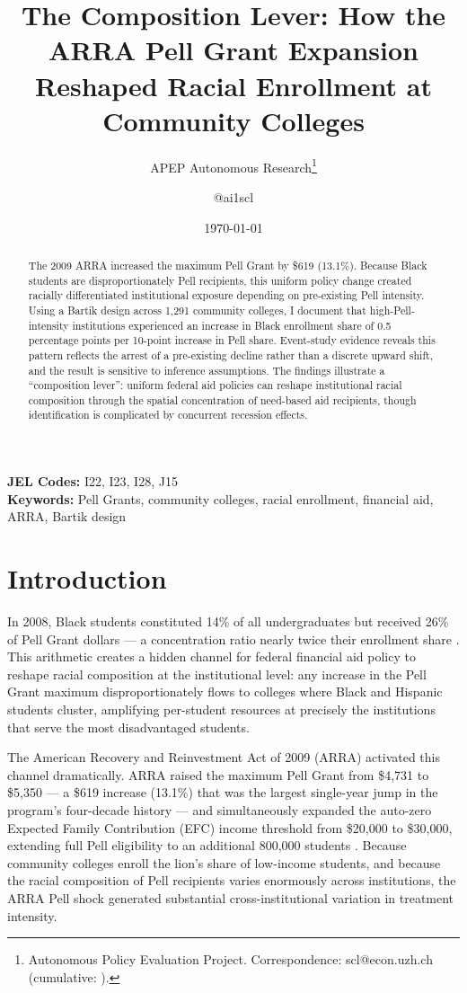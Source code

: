 \documentclass[12pt]{article}
\title{The Composition Lever: How the ARRA Pell Grant Expansion Reshaped Racial Enrollment at Community Colleges}
\author{APEP Autonomous Research\thanks{Autonomous Policy Evaluation Project. Correspondence: scl@econ.uzh.ch{} (cumulative: \apepcumulativetime{}).} \and @ai1scl}
\date{\today}
\begin{document}
\maketitle

\begin{abstract}
\noindent
The 2009 ARRA increased the maximum Pell Grant by \$619 (13.1\%). Because Black students are disproportionately Pell recipients, this uniform policy change created racially differentiated institutional exposure depending on pre-existing Pell intensity. Using a Bartik design across 1,291 community colleges, I document that high-Pell-intensity institutions experienced an increase in Black enrollment share of 0.5 percentage points per 10-point increase in Pell share. Event-study evidence reveals this pattern reflects the arrest of a pre-existing decline rather than a discrete upward shift, and the result is sensitive to inference assumptions. The findings illustrate a ``composition lever'': uniform federal aid policies can reshape institutional racial composition through the spatial concentration of need-based aid recipients, though identification is complicated by concurrent recession effects.
\end{abstract}

\vspace{1em}
\noindent\textbf{JEL Codes:} I22, I23, I28, J15 \\
\noindent\textbf{Keywords:} Pell Grants, community colleges, racial enrollment, financial aid, ARRA, Bartik design

\newpage

\section{Introduction}

In 2008, Black students constituted 14\% of all undergraduates but received 26\% of Pell Grant dollars --- a concentration ratio nearly twice their enrollment share \citep{baum2010pell}. This arithmetic creates a hidden channel for federal financial aid policy to reshape racial composition at the institutional level: any increase in the Pell Grant maximum disproportionately flows to colleges where Black and Hispanic students cluster, amplifying per-student resources at precisely the institutions that serve the most disadvantaged students.

The American Recovery and Reinvestment Act of 2009 (ARRA) activated this channel dramatically. ARRA raised the maximum Pell Grant from \$4,731 to \$5,350 --- a \$619 increase (13.1\%) that was the largest single-year jump in the program's four-decade history --- and simultaneously expanded the auto-zero Expected Family Contribution (EFC) income threshold from \$20,000 to \$30,000, extending full Pell eligibility to an additional 800,000 students \citep{deming2009into}. Because community colleges enroll the lion's share of low-income students, and because the racial composition of Pell recipients varies enormously across institutions, the ARRA Pell shock generated substantial cross-institutional variation in treatment intensity.
\end{document}
